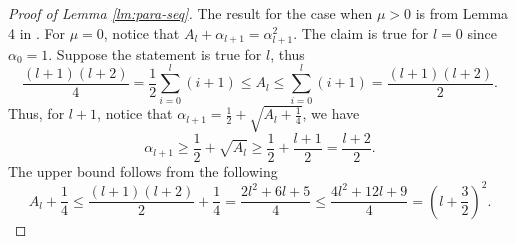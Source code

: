 \documentclass[11pt,fullpage,letterpaper]{article}
\begin{document}
\begin{proof}[Proof of Lemma \ref{lm:para-seq}]
The result for the case when $\mu>0$ is from Lemma 4 in \cite{DEVOLDER2013_strong}. For $\mu = 0$, notice that $ A_l + \alpha_{l+1}= \alpha_{l+1}^2$.
The claim is true for $l = 0$ since $\alpha_0 =1$. Suppose the statement is true for $l$, thus 
\begin{displaymath}
    \frac{(l+1)(l+2)}{4}= \frac{1}{2}\sum_{i=0}^l (i+1)\leq A_l \leq \sum_{i=0}^l (i+1) = \frac{(l+1)(l+2)}{2}.
\end{displaymath}
Thus, for $l+1$, notice that $ \alpha_{l+1} = \frac{1}{2} + \sqrt{A_l + \frac{1}{4}}$, we have
\begin{displaymath}
    \alpha_{l+1} \geq \frac{1}{2} +\sqrt{A_l} \geq \frac{1}{2} + \frac{l+1}{2} = \frac{l+2}{2}.
\end{displaymath}
The upper bound follows from the following
\begin{displaymath}
    A_l+\frac{1}{4} \leq  \frac{(l+1)(l+2)}{2} + \frac{1}{4} = \frac{2l^2+6l+5}{4} \leq \frac{4l^2+12l +9}{4} =(l+\frac{3}{2})^2.
\end{displaymath}
\end{proof}
\end{document}
